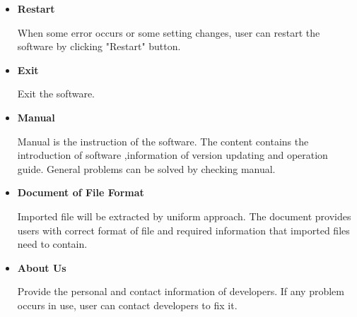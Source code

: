 \documentclass{article}
\begin{document}
      \begin{itemize}
        \item \textbf{Restart}

        When some error occurs or some setting changes, user can restart the software by clicking "Restart" button.
        \item \textbf{Exit}

        Exit the software.
        \item \textbf{Manual}

        Manual is the instruction of the software. The content contains the introduction of software ,information of version updating and operation guide. General problems can be solved by checking manual.
        \item \textbf{Document of File Format}

         Imported file will be extracted by uniform approach. The document provides users with correct format of file and required information that imported files need to contain.
        \item \textbf{About Us}

        Provide the personal and contact information of developers. If any problem occurs in use, user can contact developers to fix it.
     \end{itemize}
\end{document}
